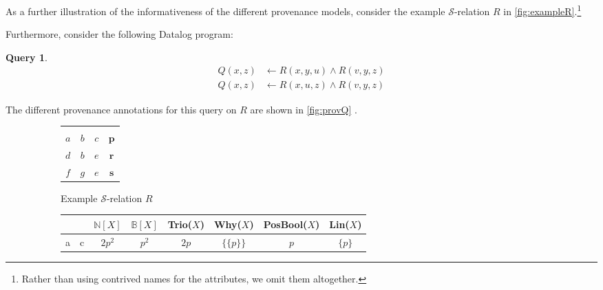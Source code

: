 \documentclass[oneside, 11pt]{amsbook}
\theoremstyle{plain}
\theoremstyle{definition}
\newtheorem{query}[thm]{Query}
\theoremstyle{remark}
\begin{document}
\begin{exmpl}
    As a further illustration of the informativeness of the different provenance models, consider the example $\mathcal{S}$-relation $R$ in \autoref{fig:exampleR}.\footnote{Rather than using contrived names for the attributes, we omit them altogether.}

    Furthermore, consider the following Datalog program:
    \begin{query}
        \[
            \begin{aligned}
                Q(x, z) & \leftarrow R(x, y, u) \land R(v, y, z) \\
                Q(x, z) & \leftarrow R(x, u, z) \land R(v, y, z)
            \end{aligned}
        \]
        \label{query:Q}
    \end{query}

    The different provenance annotations for this query on $R$ are shown in \autoref{fig:provQ} \cite{Green2011a}.

    \begin{figure}[htbp]
        \centering
        \begin{subfigure}[t]{\textwidth}
            \centering
            \begin{tabular}{|c|c|c|c}
                \cline{1-3}
                    &     &     &              \\ \cline{1-3}
                $a$ & $b$ & $c$ & $\mathbf{p}$ \\
                $d$ & $b$ & $e$ & $\mathbf{r}$ \\
                $f$ & $g$ & $e$ & $\mathbf{s}$ \\ \cline{1-3}
            \end{tabular}
            \caption{Example $\mathcal{S}$-relation $R$}
            \label{fig:exampleR}
        \end{subfigure}
        \vspace{1em}
        \begin{subfigure}[t]{\textwidth}
            \centering
            \begin{tabular}{cc|c|c|c|c|c|c}
                  &   & $\mathbb{N}[X]$ & $\mathbb{B}[X]$ & Trio($X$) & Why($X$)            & PosBool($X$) & Lin($X$)  \\
                \hline
                a & c & $2p^{2}$        & $p^{2}$         & $2p$      & $\{\{p\}\}$         & $p$          & $\{p\}$   \\


\end{tabular}
\end{subfigure}
\end{figure}
\end{exmpl}
\end{document}
